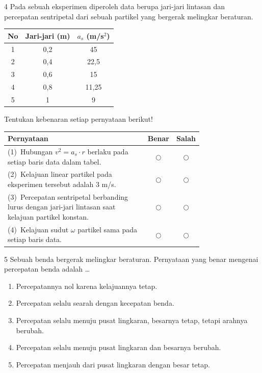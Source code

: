 \documentclass[11pt]{article}
\newenvironment{pil}{%
  \begin{enumerate}[label=(\Alph*),leftmargin=*,itemsep=1pt,topsep=3pt]}%
  {\end{enumerate}}
\begin{document}
\begin{soal}{4}  %
Pada sebuah eksperimen diperoleh data berupa jari-jari lintasan dan
percepatan sentripetal dari sebuah partikel yang bergerak melingkar
beraturan.
\begin{center}
\begin{tabular}{ccc}
\hline
No & Jari-jari (m) & $a_s$ (m/s$^2$)\\
\hline
1 & 0,2 & 45 \\
2 & 0,4 & 22,5 \\
3 & 0,6 & 15 \\
4 & 0,8 & 11,25 \\
5 & 1   & 9 \\
\hline
\end{tabular}
\end{center}
Tentukan kebenaran setiap pernyataan berikut!

\par\smallskip
{\renewcommand{\arraystretch}{1.4}%
\begin{tabular}{@{}p{0.76\linewidth}cc@{}}
\hline
\textbf{Pernyataan} & \textbf{Benar} & \textbf{Salah}\\
\hline
(1)~Hubungan $v^2 = a_s \cdot r$ berlaku pada setiap baris data
    dalam tabel.
  & $\bigcirc$ & $\bigcirc$\\
(2)~Kelajuan linear partikel pada eksperimen tersebut adalah 3 m/s.
  & $\bigcirc$ & $\bigcirc$\\
(3)~Percepatan sentripetal berbanding lurus dengan jari-jari lintasan
    saat kelajuan partikel konstan.
  & $\bigcirc$ & $\bigcirc$\\
(4)~Kelajuan sudut $\omega$ partikel sama pada setiap baris data.
  & $\bigcirc$ & $\bigcirc$\\
\hline
\end{tabular}}
\end{soal}

\begin{soal}{5}  %
Sebuah benda bergerak melingkar beraturan. Pernyataan yang benar
mengenai percepatan benda adalah \ldots
\begin{pil}
  \item Percepatannya nol karena kelajuannya tetap.
  \item Percepatan selalu searah dengan kecepatan benda.
  \item Percepatan selalu menuju pusat lingkaran, besarnya tetap,
        tetapi arahnya berubah.
  \item Percepatan selalu menuju pusat lingkaran dan besarnya berubah.
  \item Percepatan menjauh dari pusat lingkaran dengan besar tetap.
\end{pil}
\end{soal}
\end{document}
